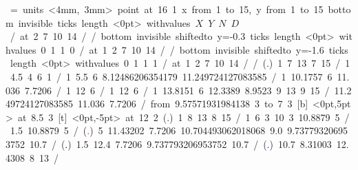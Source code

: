 \mbox{\beginpicture
\headingtoplotskip=\baselineskip
\setcoordinatesystem units <4mm, 3mm> point at 16 1
\setplotarea x from 1 to 15, y from 1 to 15
\axis bottom invisible ticks length <0pt>
  withvalues {$X$} {$Y$} {$N$} {$D$} /  at 2 7 10 14 / /
\axis bottom invisible shiftedto y=-0.3 ticks length <0pt>
  withvalues {} {0} {1} {1} {0} /
  at 1 2 7 10 14 / /
\axis bottom invisible shiftedto y=-1.6 ticks length <0pt>
  withvalues {} {0} {1} {1} {1} /
  at 1 2 7 10 14 / /
\setplotsymbol ({\normalsize .})
 1 7 13 7 15 /   %
 1 4.5 4 6 1 /   %
 1 5.5 6 8.12486206354179 11.249724127083585 /    %
 1 10.1757 6 11.036 7.7206 / %
 1 12 6 /       %
 1 12 6 /            %
 1 13.8151 6 12.3389 8.9523 9 13 9 15 / %
 11.249724127083585 11.036 7.7206 / %
\arrow <10pt> [.2,.67] from 9.57571931984138 3 to 7 3
 [b]  <0pt,5pt> at 8.5 3
 [t]  <0pt,-5pt> at 12 2
\setplotsymbol ({\footnotesize .})
\setdashes
{} 1 8 13 8 15 /                      %
 1 6 3 10 3 10.8879 5 /      %
 1.5
   10.8879 5 / %
\setsolid
\setplotsymbol ({\textcolor{red}{\footnotesize .}})
 5
   11.43202 7.7206
   10.704493062018068 9.0
   9.737793206953752 10.7 / %
\setdashes
\setplotsymbol ({\textcolor{black}{\footnotesize .}})
 1.5
   12.4 7.7206
   9.737793206953752 10.7
/ %
\setsolid
\setplotsymbol ({\textcolor{blue}{\footnotesize .}})
 10.7
   8.31003 12.4308
   8 13 / %
\setsolid
\endpicture}
